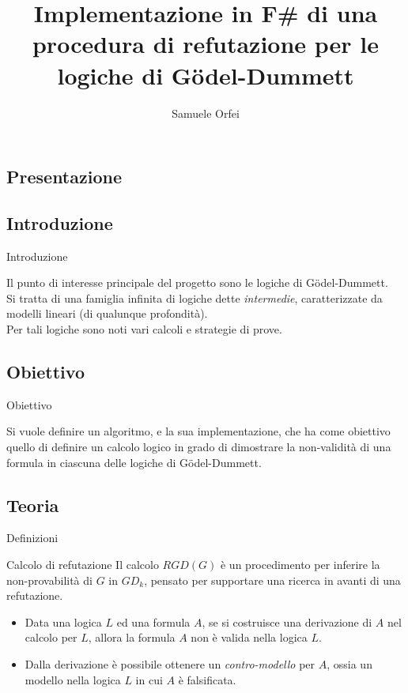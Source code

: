 \documentclass{beamer}
\title{Implementazione in F\# di una procedura di refutazione per le logiche di G\"odel-Dummett} %
\author{Samuele Orfei}
\begin{document}
\frame[c]{\maketitle}

\begin{darkframes}

    \section{Presentazione}

    \subsection{Introduzione}
    \begin{frame}{Introduzione}

        Il punto di interesse principale del progetto sono le logiche di G\"odel-Dummett. \\
        Si tratta di una famiglia infinita di logiche dette \textit{intermedie}, caratterizzate da modelli lineari (di qualunque profondità). \\
        Per tali logiche sono noti vari calcoli e strategie di prove.

    \end{frame}

    \subsection{Obiettivo}
    \begin{frame}{Obiettivo}

        Si vuole definire un algoritmo, e la sua implementazione, che ha come obiettivo quello di definire un calcolo logico in grado di dimostrare la non-validità di una formula in ciascuna delle logiche di G\"odel-Dummett.\\

    \end{frame}

    \subsection{Teoria}

    \begin{frame}{Definizioni}
        \begin{block}{Calcolo di refutazione}
            Il calcolo $RGD(G)$ è un procedimento per inferire la non-provabilità di $G$ in $GD_k$, pensato per supportare una ricerca in avanti di una refutazione.
        \end{block}
        \begin{itemize}
            \item Data una logica $L$ ed una formula $A$, se si costruisce una derivazione di $A$ nel calcolo per $L$, allora la formula $A$ non è valida nella logica $L$.
            \item Dalla derivazione è possibile ottenere un \textit{contro-modello} per $A$, ossia un modello nella logica $L$ in cui $A$ è falsificata.
        \end{itemize}
    \end{frame}


\end{darkframes}
\end{document}
